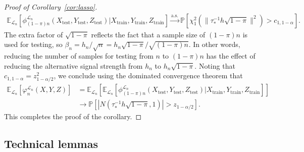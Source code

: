 \documentclass[12pt]{article}
\theoremstyle{definition}
\theoremstyle{remark}
\newcommand{\srx}{X}
\newcommand{\srz}{Z}
\newcommand{\sry}{Y}
\begin{document}
\begin{proof}[Proof of Corollary~\ref{cor:lasso}]
\begin{equation*}
	\begin{split}
		\mathbb E_{\mathcal L_n}[\phi^{\mathcal L_n}_{(1-\pi)n}(\srx_{\text{test}}, \sry_{\text{test}}, \srz_{\text{test}})|\srx_{\text{train}}, \sry_{\text{train}}, \srz_{\text{train}}] \overset{\text{a.s.}}\rightarrow \mathbb P[\chi^2_1(\|\tau_*^{-1} h\sqrt{1-\pi}\|^2) > c_{1,1-\alpha}].
	\end{split}
\end{equation*}
The extra factor of $\sqrt{1-\pi}$ reflects the fact that a sample size of $(1-\pi)n$ is used for testing, so $\beta_n = h_n/\sqrt{n} = h_n\sqrt{1-\pi}/\sqrt{(1-\pi)n}$. In other words, reducing the number of samples for testing from $n$ to $(1-\pi)n$ has the effect of reducing the alternative signal strength from $h_n$ to $h_n \sqrt{1-\pi}$. Noting that $c_{1,1-\alpha} = z^2_{1-\alpha/2}$, we conclude using the dominated convergence theorem that
\begin{equation*}
	\begin{split}
		\mathbb E_{\mathcal L_n}[\varphi^{\mathcal L_n}_{n}(\srx, \sry, \srz)] &=  
		\mathbb E_{\mathcal L_n}\left[\mathbb E_{\mathcal L_n}[\phi^{\mathcal L_n}_{(1-\pi)n}(\srx_{\text{test}}, \sry_{\text{test}}, \srz_{\text{test}})|\srx_{\text{train}}, \sry_{\text{train}}, \srz_{\text{train}}]\right] \\
		&\rightarrow \mathbb P[|N(\tau_*^{-1} h\sqrt{1-\pi},1)| > z_{1-\alpha/2}].
	\end{split}
\end{equation*}
This completes the proof of the corollary.
\end{proof}

\subsection{Technical lemmas}
\end{document}
